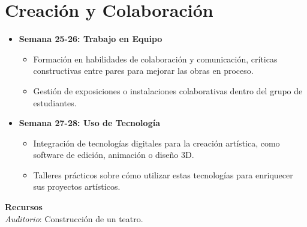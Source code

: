 \section{Creación y Colaboración}
\begin{itemize}
  \item \textbf{Semana 25-26: Trabajo en Equipo}
  \begin{itemize}
    \item Formación en habilidades de colaboración y comunicación, críticas constructivas entre pares para mejorar las obras en proceso.
    \item Gestión de exposiciones o instalaciones colaborativas dentro del grupo de estudiantes.
  \end{itemize}
  \item \textbf{Semana 27-28: Uso de Tecnología}
  \begin{itemize}
    \item Integración de tecnologías digitales para la creación artística, como software de edición, animación o diseño 3D.
    \item Talleres prácticos sobre cómo utilizar estas tecnologías para enriquecer sus proyectos artísticos.
  \end{itemize}
\end{itemize}
{\large \textbf{Recursos}}\\
\textit{Auditorio}: Construcción de un teatro.
